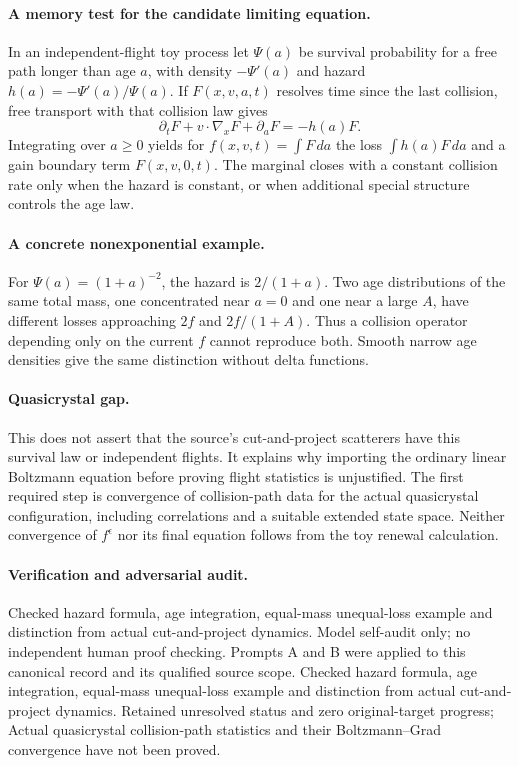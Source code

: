 \documentclass[11pt]{article}
\begin{document}
\paragraph{A memory test for the candidate limiting equation.} In an independent-flight toy process let $\Psi(a)$ be survival probability for a free path longer than age $a$, with density $-\Psi'(a)$ and hazard $h(a)=-\Psi'(a)/\Psi(a)$. If $F(x,v,a,t)$ resolves time since the last collision, free transport with that collision law gives
\[
 \partial_tF+v\cdot\nabla_xF+\partial_aF=-h(a)F.
\]
Integrating over $a\geq0$ yields for $f(x,v,t)=\int F\,da$ the loss $\int h(a)F\,da$ and a gain boundary term $F(x,v,0,t)$. The marginal closes with a constant collision rate only when the hazard is constant, or when additional special structure controls the age law.

\paragraph{A concrete nonexponential example.} For $\Psi(a)=(1+a)^{-2}$, the hazard is $2/(1+a)$. Two age distributions of the same total mass, one concentrated near $a=0$ and one near a large $A$, have different losses approaching $2f$ and $2f/(1+A)$. Thus a collision operator depending only on the current $f$ cannot reproduce both. Smooth narrow age densities give the same distinction without delta functions.

\paragraph{Quasicrystal gap.} This does not assert that the source's cut-and-project scatterers have this survival law or independent flights. It explains why importing the ordinary linear Boltzmann equation before proving flight statistics is unjustified. The first required step is convergence of collision-path data for the actual quasicrystal configuration, including correlations and a suitable extended state space. Neither convergence of $f^\epsilon$ nor its final equation follows from the toy renewal calculation.

\paragraph{Verification and adversarial audit.}
Checked hazard formula, age integration, equal-mass unequal-loss example and distinction from actual cut-and-project dynamics. Model self-audit only; no independent human proof checking. Prompts A and B were applied to this canonical record and its qualified source scope. Checked hazard formula, age integration, equal-mass unequal-loss example and distinction from actual cut-and-project dynamics. Retained unresolved status and zero original-target progress; Actual quasicrystal collision-path statistics and their Boltzmann–Grad convergence have not been proved.
\end{document}
